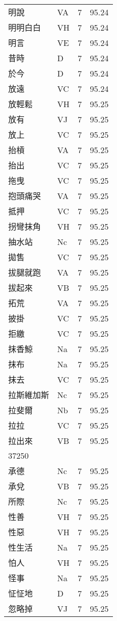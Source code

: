 \documentclass[twocolumn]{book}
\begin{document}
\begin{supertabular}{llrr}
明說 & VA & 7 &  95.24\\
明明白白 & VH & 7 &  95.24\\
明言 & VE & 7 &  95.24\\
昔時 & D & 7 &  95.24\\
於今 & D & 7 &  95.24\\
放遠 & VC & 7 &  95.24\\
放輕鬆 & VH & 7 &  95.25\\
放有 & VJ & 7 &  95.25\\
放上 & VC & 7 &  95.25\\
抬槓 & VA & 7 &  95.25\\
抬出 & VC & 7 &  95.25\\
拖曳 & VC & 7 &  95.25\\
抱頭痛哭 & VA & 7 &  95.25\\
抵押 & VC & 7 &  95.25\\
拐彎抹角 & VH & 7 &  95.25\\
抽水站 & Nc & 7 &  95.25\\
拋售 & VC & 7 &  95.25\\
拔腿就跑 & VA & 7 &  95.25\\
拔起來 & VB & 7 &  95.25\\
拓荒 & VA & 7 &  95.25\\
披掛 & VC & 7 &  95.25\\
拒繳 & VC & 7 &  95.25\\
抹香鯨 & Na & 7 &  95.25\\
抹布 & Na & 7 &  95.25\\
抹去 & VC & 7 &  95.25\\
拉斯維加斯 & Nc & 7 &  95.25\\
拉斐爾 & Nb & 7 &  95.25\\
拉拉 & VC & 7 &  95.25\\
拉出來 & VB & 7 &  95.25\\
37250\\
承德 & Nc & 7 &  95.25\\
承兌 & VB & 7 &  95.25\\
所際 & Nc & 7 &  95.25\\
性善 & VH & 7 &  95.25\\
性惡 & VH & 7 &  95.25\\
性生活 & Na & 7 &  95.25\\
怕人 & VH & 7 &  95.25\\
怪事 & Na & 7 &  95.25\\
怔怔地 & D & 7 &  95.25\\
忽略掉 & VJ & 7 &  95.25\\

\end{supertabular}
\end{document}

